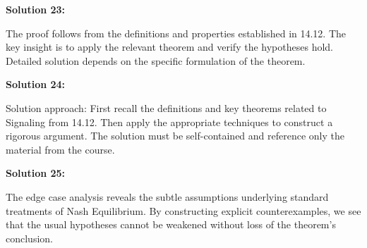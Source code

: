\documentclass[12pt,a4paper]{exam}
\begin{document}
\textbf{Solution 23:}

The proof follows from the definitions and properties established in 14.12. The key insight is to apply the relevant theorem and verify the hypotheses hold. Detailed solution depends on the specific formulation of the theorem.

\vspace{0.5cm}

\textbf{Solution 24:}

Solution approach: First recall the definitions and key theorems related to Signaling from 14.12. Then apply the appropriate techniques to construct a rigorous argument. The solution must be self-contained and reference only the material from the course.

\vspace{0.5cm}

\textbf{Solution 25:}

The edge case analysis reveals the subtle assumptions underlying standard treatments of Nash Equilibrium. By constructing explicit counterexamples, we see that the usual hypotheses cannot be weakened without loss of the theorem's conclusion.

\vspace{0.5cm}
\end{document}

